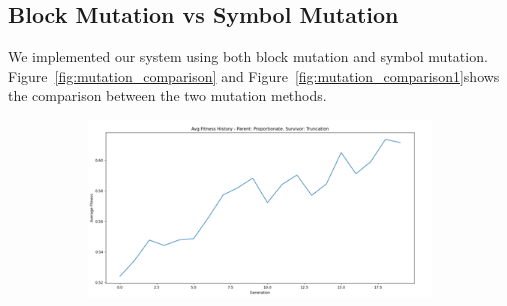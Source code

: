 \subsection{Block Mutation vs Symbol Mutation}

We implemented our system using both block mutation and symbol mutation. Figure~\ref{fig:mutation_comparison} and Figure~\ref{fig:mutation_comparison1}shows the comparison between the two mutation methods.

\begin{figure}[H]
    \centering
    \begin{subfigure}[b]{0.3\textwidth}
        \includegraphics[width=\textwidth]{block1.png}
    \end{subfigure}
    \begin{subfigure}[b]{0.1\textwidth}

\end{subfigure}
\end{figure}
